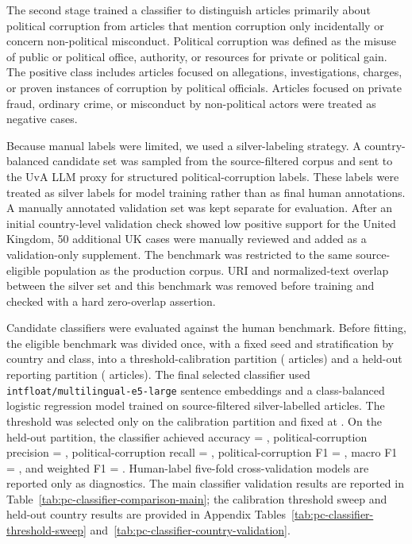 The second stage trained a classifier to distinguish articles primarily about political corruption from articles that mention corruption only incidentally or concern non-political misconduct. Political corruption was defined as the misuse of public or political office, authority, or resources for private or political gain. The positive class includes articles focused on allegations, investigations, charges, or proven instances of corruption by political officials. Articles focused on private fraud, ordinary crime, or misconduct by non-political actors were treated as negative cases.

Because manual labels were limited, we used a silver-labeling strategy. A country-balanced candidate set was sampled from the source-filtered corpus and sent to the UvA LLM proxy for structured political-corruption labels. These labels were treated as silver labels for model training rather than as final human annotations. A manually annotated validation set was kept separate for evaluation. After an initial country-level validation check showed low positive support for the United Kingdom, 50 additional UK cases were manually reviewed and added as a validation-only supplement. The benchmark was restricted to the same source-eligible population as the production corpus. URI and normalized-text overlap between the silver set and this benchmark was removed before training and checked with a hard zero-overlap assertion.

Candidate classifiers were evaluated against the human benchmark. Before fitting, the eligible benchmark was divided once, with a fixed seed and stratification by country and class, into a threshold-calibration partition (\PCCalibrationN{} articles) and a held-out reporting partition (\PCHeldOutN{} articles). The final selected classifier used \texttt{intfloat/}\allowbreak\texttt{multilingual-e5-large} sentence embeddings and a class-balanced logistic regression model trained on \PCSilverTrainN{} source-filtered silver-labelled articles. The threshold was selected only on the calibration partition and fixed at \PCThreshold{}. On the held-out partition, the classifier achieved accuracy = \PCTestAccuracy{}, political-corruption precision = \PCTestPrecision{}, political-corruption recall = \PCTestRecall{}, political-corruption F1 = \PCTestFOne{}, macro F1 = \PCTestMacroFOne{}, and weighted F1 = \PCTestWeightedFOne{}. Human-label five-fold cross-validation models are reported only as diagnostics. The main classifier validation results are reported in Table~\ref{tab:pc-classifier-comparison-main}; the calibration threshold sweep and held-out country results are provided in Appendix Tables~\ref{tab:pc-classifier-threshold-sweep} and~\ref{tab:pc-classifier-country-validation}.

